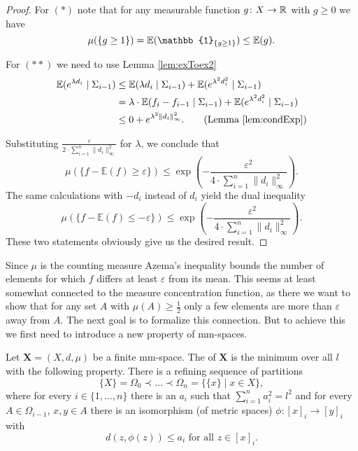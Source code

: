 \begin{proof}
	For $(\ast)$ note that for any measurable function $g\colon X\to\mathbb{R}$ with $g\geq0$ we have %
	\[\mu(\{g\geq1\})=\E(\mathbb{1}_{\{g\geq1\}})\leq\E(g).\]
				
	For $(\ast\ast)$ we need to use Lemma \ref{lem:exToex2}
	\begin{align*}
		\E(e^{\lambda d_i}\mid \Sigma_{i-1}) & \leq \E(\lambda d_i\mid\Sigma_{i-1})+\E(e^{\lambda^2 d^2_i}\mid\Sigma_{i-1})            \\
		                                     & =\lambda\cdot\E( f_i-f_{i-1}\mid\Sigma_{i-1}) + \E(e^{\lambda^2 d^2_i}\mid\Sigma_{i-1}) \\
		                                     & \leq 0 + e^{\lambda^2 \|d_i\|_\infty^2}.\tag{Lemma \ref{lem:condExp}}                   
	\end{align*}
				
	Substituting $\frac{\varepsilon}{2\cdot\sum_{i=1}^{n}\|d_i\|_\infty^2}$ for $\lambda$, we conclude that
	\[\mu(\{f-\mathbb{E}(f)\geq \varepsilon\})\leq\exp\left(-\frac{\varepsilon^2}{4\cdot\sum_{i=1}^{n}\|d_i\|^2_\infty}\right). \]
	The same calculations with $-d_i$ instead of $d_i$ yield the dual inequality
	\[\mu(\{f-\mathbb{E}(f)\leq -\varepsilon\})\leq\exp\left(-\frac{\varepsilon^2}{4\cdot\sum_{i=1}^{n}\|d_i\|^2_\infty}\right). \]
	These two statements obviously give us the desired result.
\end{proof}
		
Since $\mu$ is the counting measure Azema's inequality bounds the number of elements for which $f$ differs at least $\varepsilon$ from its mean. This seems at least somewhat connected to the measure concentration function, as there we want to show that for any set $A$ with $\mu(A)\geq\frac{1}{2}$ only a few elements are more than $\varepsilon$ away from $A$.
The next goal is to formalize this connection. %
But to achieve this we first need to introduce a new property of mm-spaces.
\begin{definition}\label{def:length}
	Let $\boldsymbol{X}=(X,d,\mu)$ be a finite mm-space. The  of $\boldsymbol X$ is the minimum over all $l$ with the following property. There is a refining sequence of partitions 
	\[\{X\}=\Omega_0\prec\dots\prec\Omega_n=\{\{x\}\mid x\in X\},\]
	where for every $i\in\{1,\dots,n\}$ there is an $a_i$ such that $\sum_{i=1}^{n}a^2_i=l^2$ and for every $A\in \Omega_{i-1}$, $x,y\in A$ there is an isomorphism (of metric spaces) $\phi\colon[x]_i\to [y]_i$ with 
	\[d(z,\phi(z))\leq a_i\text{ for all $z\in[x]_i$.}\]
\end{definition}
		

